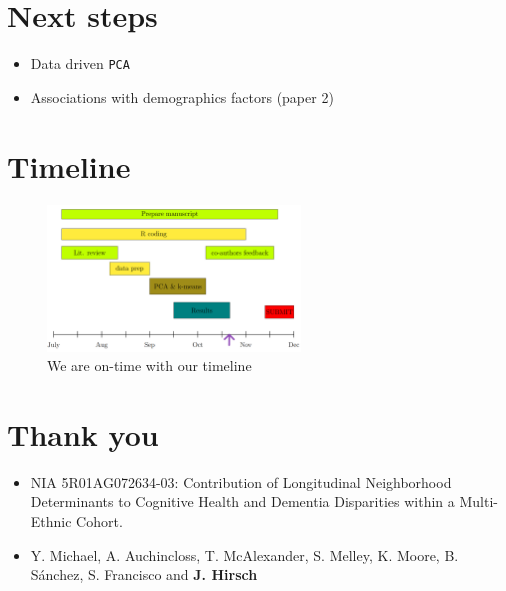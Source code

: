 \documentclass[
  letterpaper,
  DIV=11,
  numbers=noendperiod]{scrartcl}
\providecommand{\tightlist}{%
  \setlength{\itemsep}{0pt}\setlength{\parskip}{0pt}}\usepackage{longtable,booktabs,array}
\begin{document}
\hypertarget{next-steps}{%
\section{Next steps}\label{next-steps}}

\begin{itemize}
\tightlist
\item
  Data driven \texttt{PCA}
\item
  Associations with demographics factors (paper 2)
\end{itemize}

\hypertarget{timeline}{%
\section{Timeline}\label{timeline}}

\begin{figure}

{\centering \includegraphics[width=0.6\textwidth,height=\textheight]{imgs/timeline.png}

}

\caption{We are on-time with our timeline}

\end{figure}

\hypertarget{thank-you}{%
\section{Thank you}\label{thank-you}}

\begin{itemize}
\tightlist
\item
  NIA 5R01AG072634-03: Contribution of Longitudinal Neighborhood
  Determinants to Cognitive Health and Dementia Disparities within a
  Multi-Ethnic Cohort.
\item
  Y. Michael, A. Auchincloss, T. McAlexander, S. Melley, K. Moore, B.
  Sánchez, S. Francisco and \textbf{J. Hirsch}
\end{itemize}
\end{document}
